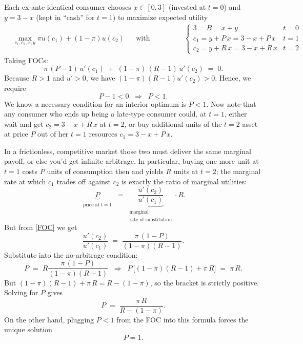\documentclass[12pt]{article}
\begin{document}
\begin{enumerate}[label=(\alph*)]
    Each ex‐ante identical consumer chooses $x\in[0,3]$ (invested at $t=0$) and $y=3-x$ (kept in “cash” for $t=1$) to maximize expected utility
    \begin{align*}
        &\max_{c_1, c_2, x,y} \pi u(c_1) + (1-\pi)u(c_2) && \text{with budget constraints:} && \begin{cases}
            3=B  =x+y & t=0
            \\ c_1 = y + P\,x = 3 - x + P\,x & t=1
            \\ c_2 = y + R\,x = 3 - x + R\,x & t=2
        \end{cases}
    \end{align*}
Taking FOCs:
\begin{equation}
    \pi\,(P-1)\,u'(c_1)\;+\;(1-\pi)\,(R-1)\,u'(c_2)\;=\;0.
\label{FOC}
\end{equation}
Because $R>1$ and $u'>0$, we have $(1-\pi)(R-1)u'(c_2)>0$.  Hence, we require
$$
P-1<0
\;\;\Longrightarrow\;\;
P<1.
$$
We know a necessary condition for an interior optimum is $P<1$.
Now note that any consumer who ends up being a late-type consumer could, at $t=1$,
either wait and get $c_2=3 - x + R\,x$ at $t=2$,
or buy additional units of the $t=2$ asset at price $P$ out of her $t=1$ resources $c_1 = 3 - x + P\,x$.

In a frictionless, competitive market those two must deliver the same  marginal payoff, or else you’d get infinite arbitrage.  In particular, buying one more unit at $t=1$ costs $P$ units of consumption then and yields $R$ units at $t=2$; the marginal rate at which $c_1$ trades off against $c_2$ is exactly the ratio of marginal utilities:
\begin{equation}
    \underbrace{P}_{\substack{\text{price at}~t=1}}
\;=\;
\underbrace{\frac{u'(c_2)}{u'(c_1)}}_{\substack{\text{marginal}\\\text{rate of substitution}}} \cdot R.
\label{No–arb}
\end{equation}
But from \eqref{FOC} we get
$$
\frac{u'(c_2)}{u'(c_1)}
\;=\;
\frac{\pi\,(1-P)}{(1-\pi)(R-1)}.
$$
Substitute  into the no-arbitrage condition:
$$
P
\;=\;
R 
\frac{\pi\,(1-P)}{(1-\pi)(R-1)}
\;\;\Longrightarrow\;\;
P\,\bigl[(1-\pi)(R-1) + \pi\,R \bigr]
\;=\;
\pi\,R.
$$
But $(1-\pi)(R-1) + \pi\,R = R - (1-\pi)$, so the bracket is strictly positive.  Solving for $P$ gives
$$
P \;=\;\frac{\pi\,R}{R - (1-\pi)}.
$$
On the other hand, plugging $P<1$ from the FOC into this formula forces the unique solution
$$
\boxed{P=1.}
$$


\end{enumerate}
\end{document}
